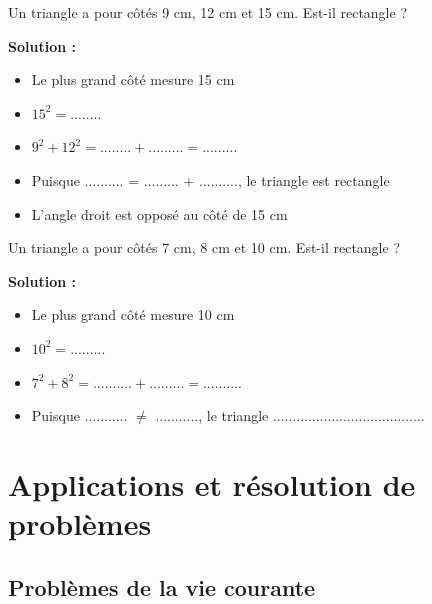 \begin{examplebox}
Un triangle a pour côtés 9 cm, 12 cm et 15 cm. Est-il rectangle ?

\textbf{Solution :}
\begin{itemize}
    \item Le plus grand côté mesure 15 cm
    \item $15^2 = ........$
    \item $9^2 + 12^2 = ........ + ......... = .........$
    \item Puisque .......... = ......... + .........., le triangle est rectangle
    \item L'angle droit est opposé au côté de 15 cm
\end{itemize}
\end{examplebox}

\begin{examplebox}
Un triangle a pour côtés 7 cm, 8 cm et 10 cm. Est-il rectangle ?

\textbf{Solution :}
\begin{itemize}
    \item Le plus grand côté mesure 10 cm
    \item $10^2 = .........$
    \item $7^2 + 8^2 = .......... + ......... = ..........$
    \item Puisque ........... $\neq$ ..........., le triangle .......................................
\end{itemize}
\end{examplebox}

\section{Applications et résolution de problèmes}

\subsection{Problèmes de la vie courante}

